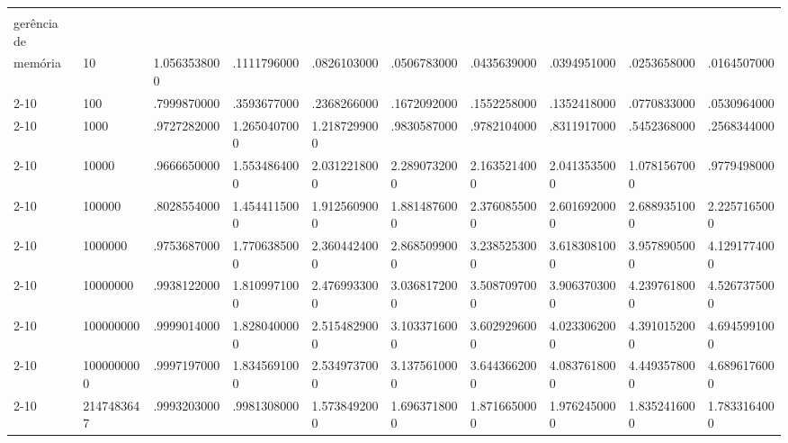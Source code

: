 \begin{flushleft}
{\begin{tabular}{|p{1.5cm}|p{1.2cm}|p{1.3cm}|p{1.3cm}|p{1.3cm}|p{1.3cm}|p{1.3cm}|p{1.3cm}|p{1.3cm}|p{1.3cm}|}
\rule{0pt}{4ex}\multirow{9}{*}{\shortstack[l]{\textit{Speedup} com\\gerência de \\memória}} 
& 10 						& 	1.0563538000 	& .1111796000 		& .0826103000 		& .0506783000 		& .0435639000 		& .0394951000 		& .0253658000 		& .0164507000					\\\cline{2-10}
&100 						& .7999870000 		& .3593677000 		& .2368266000 		& .1672092000 		& .1552258000 		& .1352418000 		& .0770833000 		& .0530964000				\\\cline{2-10}
&1000 					& 	.9727282000 		& 1.2650407000 	& 1.2187299000 	& .9830587000 		& .9782104000 		& .8311917000 		& .5452368000 		& .2568344000					\\\cline{2-10}
&10000 				& 	.9666650000 		& 1.5534864000 	& 2.0312218000 	& 2.2890732000 	& 2.1635214000 	& 2.0413535000 	& 1.0781567000 	& .9779498000				\\\cline{2-10}
&100000 				& 	.8028554000 		& 1.4544115000 	& 1.9125609000 	& 1.8814876000 	& 2.3760855000 	& 2.6016920000 	& 2.6889351000 	& 2.2257165000				\\\cline{2-10}
&1000000			& 	.9753687000 		& 1.7706385000 	& 2.3604424000 	& 2.8685099000 	& 3.2385253000 	& 3.6183081000 	& 3.9578905000 	& 4.1291774000				\\\cline{2-10}
&10000000 		& 	.9938122000 		& 1.8109971000 	& 2.4769933000 	& 3.0368172000 	& 3.5087097000 	& 3.9063703000 	& 4.2397618000 	& 4.5267375000				\\\cline{2-10}
&100000000 		& 	.9999014000 		& 1.8280400000 	& 2.5154829000 	& 3.1033716000 	& 3.6029296000 	& 4.0233062000 	& 4.3910152000 	& 4.6945991000				\\\cline{2-10}
&1000000000	& 	.9997197000 		& 1.8345691000 	& 2.5349737000 	& 3.1375610000 	& 3.6443662000 	& 4.0837618000 	& 4.4493578000 	& 4.6896176000			\\\cline{2-10}
&2147483647		& 	.9993203000 		& .9981308000 		& 1.5738492000 	& 1.6963718000 	& 1.8716650000 	& 1.9762450000 	& 1.8352416000 	& 1.7833164000					\\\hline



\end{tabular}}
\end{flushleft}
